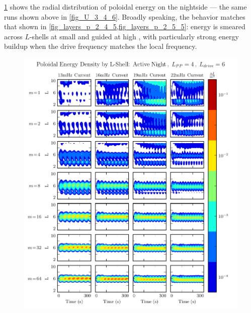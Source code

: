 \cref{fig_layers_p_3_4_6} shows the radial distribution of poloidal energy on the nightside --- the same runs shown above in \cref{fig_U_3_4_6}. Broadly speaking, the behavior matches that shown in \cref{fig_layers_p_2_4_5,fig_layers_p_2_5_5}: energy is smeared across $L$-shells at small \azm and guided at high \azm, with particularly strong energy buildup when the drive frequency matches the local \Alfven frequency. 


\begin{figure}[!htb]
    \centering
    \includegraphics[width=\textwidth]{figures/layers_p_3_4_6.pdf}
    \caption[Radial Distribution of Poloidal Energy: Active Night, Driving at $L=6$]{
      \todo{$\cdots$}
    }
    \label{fig_layers_p_3_4_6}
\end{figure}

